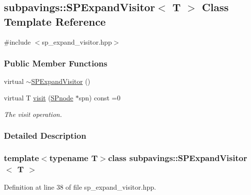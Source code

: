 \hypertarget{classsubpavings_1_1SPExpandVisitor}{\subsection{subpavings\-:\-:\-S\-P\-Expand\-Visitor$<$ \-T $>$ \-Class \-Template \-Reference}
\label{classsubpavings_1_1SPExpandVisitor}
}


{\ttfamily \#include $<$sp\-\_\-expand\-\_\-visitor.\-hpp$>$}

\subsubsection*{\-Public \-Member \-Functions}
\begin{DoxyCompactItemize}
\item 
virtual \hyperlink{classsubpavings_1_1SPExpandVisitor_a47408d1102671af8e8645f587022c4cd}{$\sim$\-S\-P\-Expand\-Visitor} ()
\item 
virtual \-T \hyperlink{classsubpavings_1_1SPExpandVisitor_a72d834e1dad55c141a4182e31a324218}{visit} (\hyperlink{classsubpavings_1_1SPnode}{\-S\-Pnode} $\ast$spn) const =0
\begin{DoxyCompactList}\small\item\em \-The visit operation. \end{DoxyCompactList}\end{DoxyCompactItemize}


\subsubsection{\-Detailed \-Description}
\subsubsection*{template$<$typename \-T$>$class subpavings\-::\-S\-P\-Expand\-Visitor$<$ T $>$}



\-Definition at line 38 of file sp\-\_\-expand\-\_\-visitor.\-hpp.




